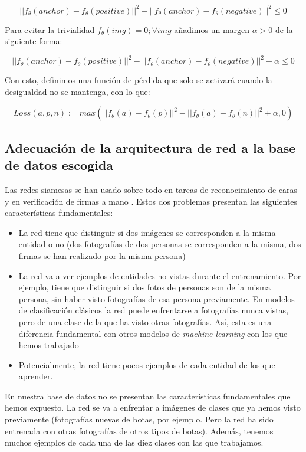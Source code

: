 \documentclass[11pt]{article}
\begin{document}
$$||f_{\theta}(anchor) - f_{\theta}(positive)||^2 - ||f_{\theta}(anchor) - f_{\theta}(negative)||^2 \leq 0$$

Para evitar la trivialidad $f_{\theta}(img) = 0; \forall img$ añadimos un margen $\alpha > 0$ de la siguiente forma:

$$||f_{\theta}(anchor) - f_{\theta}(positive)||^2 - ||f_{\theta}(anchor) - f_{\theta}(negative)||^2 + \alpha \leq 0$$

Con esto, definimos una función de pérdida que solo se activará cuando la desigualdad no se mantenga, con lo que:

$$Loss(a, p, n) := max(||f_{\theta}(a) - f_{\theta}(p)||^2 - ||f_{\theta}(a) - f_{\theta}(n)||^2 + \alpha, 0)$$

\pagebreak
\subsection{Adecuación de la arquitectura de red a la base de datos escogida} \label{adecuacion_arquitectura_red:seccion}

Las redes siamesas se han usado sobre todo en tareas de reconocimiento de caras y en verificación de firmas a mano \cite{siamese_wikipedia:online}. Estos dos problemas presentan las siguientes características fundamentales:

\begin{itemize}
  \item La red tiene que distinguir si dos imágenes se corresponden a la misma entidad o no (dos fotografías de dos personas se corresponden a la misma, dos firmas se han realizado por la misma persona)
  \item La red va a ver ejemplos de entidades no vistas durante el entrenamiento. Por ejemplo, tiene que distinguir si dos fotos de personas son de la misma persona, sin haber visto fotografías de esa persona previamente. En modelos de clasificación clásicos la red puede enfrentarse a fotografías nunca vistas, pero de una clase de la que ha visto otras fotografías. Así, esta es una diferencia fundamental con otros modelos de \emph{machine learning} con los que hemos trabajado
  \item Potencialmente, la red tiene pocos ejemplos de cada entidad de los que aprender.
\end{itemize}

En nuestra base de datos no se presentan las características fundamentales que hemos expuesto. La red se va a enfrentar a imágenes de clases que ya hemos visto previamente (fotografías nuevas de botas, por ejemplo. Pero la red ha sido entrenada con otras fotografías de otros tipos de botas). Además, tenemos muchos ejemplos de cada una de las diez clases con las que trabajamos.
\end{document}

